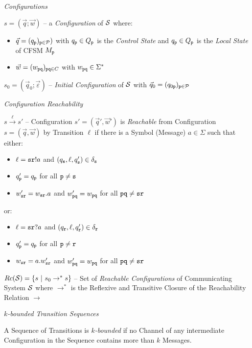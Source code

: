 \emph{Configurations}

$s = (\vec{q};\vec{w})$ -- a \emph{Configuration} of $\mathcal{S}$
where:
\begin{itemize}
  \item $\vec{q} = (q_\mathtt{p})_{\mathtt{p} \in \mathcal{P}})$ with
    $q_\mathtt{p} \in Q_\mathtt{p}$ is the \emph{Control State} and
    $q_\mathtt{p} \in Q_\mathtt{p}$ is the \emph{Local State} of CFSM
    $M_\mathtt{p}$
  \item $\vec{w} = (w_\mathtt{pq})_{\mathtt{pq} \in C}$ with
    $w_\mathtt{pq} \in \Sigma^*$
\end{itemize}
$s_0 = (\vec{q}_0;\vec{\varepsilon})$ -- \emph{Initial Configuration}
of $\mathcal{S}$ with $\vec{q}_0 = (q_{0\mathtt{p}})_{\mathtt{p} \in
  \mathcal{P}}$

\emph{Configuration Reachability}

$s \xrightarrow{\ell} s'$ -- Configuration $s' = (\vec{q}',\vec{w}')$
is \emph{Reachable} from Configuration $s = (\vec{q},\vec{w})$ by
Transition $\ell$ if there is a Symbol (Message) $a \in \Sigma$ such
that either:
\begin{itemize}
  \item $\ell = \mathtt{sr}!a$ and $(q_\mathtt{s},\ell,q_\mathtt{s}') \in
    \delta_\mathtt{s}$
  \item $q_\mathtt{p}' = q_\mathtt{p}$ for all $\mathtt{p \neq s}$
  \item $w_\mathtt{sr}' = w_\mathtt{sr}.a$ and $w_\mathtt{pq}' =
    w_\mathtt{pq}$ for all $\mathtt{pq \neq sr}$
\end{itemize}
or:
\begin{itemize}
  \item $\ell = \mathtt{sr}?a$ and $(q_\mathtt{r},\ell,q_\mathtt{r}') \in
    \delta_\mathtt{r}$
  \item $q_\mathtt{p}' = q_\mathtt{p}$ for all $\mathtt{p \neq r}$
  \item $w_\mathtt{sr} = a.w_\mathtt{sr}'$ and $w_\mathtt{pq}' =
    w_\mathtt{pq}$ for all $\mathtt{pq \neq sr}$
\end{itemize}

$Rc(\mathcal{S}) = \{ s \ |\ s_0 \rightarrow^* s \}$ -- Set of
\emph{Reachable Configurations} of Communicating System $\mathcal{S}$
where $\rightarrow^*$ is the Reflexive and Transitive Closure of the
Reachability Relation $\rightarrow$

\emph{$k$-bounded Transition Sequences}

A Sequence of Transitions is \emph{$k$-bounded} if no Channel of any
intermediate Configuration in the Sequence contains more than $k$
Messages.

